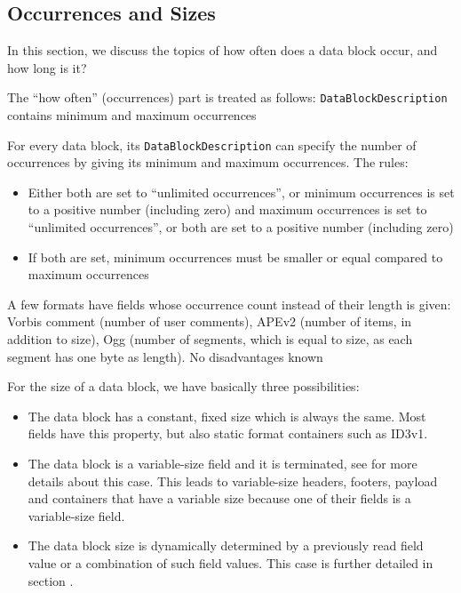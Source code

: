 \subsection{Occurrences and Sizes}%
\label{sec:Sizes}%

In this section, we discuss the topics of how often does a data block occur, and how long is it?

The ``how often'' (occurrences) part is treated as follows:
{%
\texttt{DataBlockDescription} contains minimum and maximum occurrences
}
{%
For every data block, its \texttt{DataBlockDescription} can specify the number of occurrences by giving its minimum and maximum occurrences. The rules:
\begin{itemize}
\item Either both are set to ``unlimited occurrences'', or minimum occurrences is set to a positive number (including zero) and maximum occurrences is set to ``unlimited occurrences'', or both are set to a positive number (including zero)
\item If both are set, minimum occurrences must be smaller or equal compared to maximum occurrences
\end{itemize}
}
{%
A few formats have fields whose occurrence count instead of their length is given: Vorbis comment (number of user comments), APEv2 (number of items, in addition to size), Ogg (number of segments, which is equal to size, as each segment has one byte as length).
}
{%
No disadvantages known
}
 
For the size of a data block, we have basically three possibilities:
\begin{itemize}
\item The data block has a constant, fixed size which is always the same. Most fields have this property, but also static format containers such as ID3v1. 
\item The data block is a variable-size field and it is terminated, see  for more details about this case. This leads to variable-size headers, footers, payload and containers that have a variable size because one of their fields is a variable-size field.
\item The data block size is dynamically determined by a previously read field value or a combination of such field values. This case is further detailed in section .
\end{itemize}

